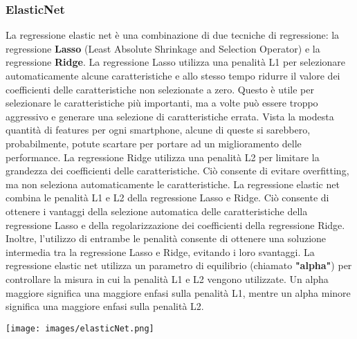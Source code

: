 \documentclass{article}
\begin{document}
        \subsubsection{ElasticNet}\newline
        La regressione elastic net è una combinazione di due tecniche di regressione: la regressione \textbf{Lasso} (Least Absolute Shrinkage and Selection Operator) e la regressione \textbf{Ridge}.\newline
        La regressione Lasso utilizza una penalità L1 per selezionare automaticamente alcune caratteristiche e allo stesso tempo ridurre il valore dei coefficienti delle caratteristiche non selezionate a zero. Questo è utile per selezionare le caratteristiche più importanti, ma a volte può essere troppo aggressivo e generare una selezione di caratteristiche errata. Vista la modesta quantità di features per ogni smartphone, alcune di queste  si sarebbero, probabilmente, potute scartare per portare ad un miglioramento delle performance.\newline
        La regressione Ridge utilizza una penalità L2 per limitare la grandezza dei coefficienti delle caratteristiche. Ciò consente di evitare overfitting, ma non seleziona automaticamente le caratteristiche.\newline
        La regressione elastic net combina le penalità L1 e L2 della regressione Lasso e Ridge. Ciò consente di ottenere i vantaggi della selezione automatica delle caratteristiche della regressione Lasso e della regolarizzazione dei coefficienti della regressione Ridge. Inoltre, l'utilizzo di entrambe le penalità consente di ottenere una soluzione intermedia tra la regressione Lasso e Ridge, evitando i loro svantaggi.\newline
        La regressione elastic net utilizza un parametro di equilibrio (chiamato \textbf{"alpha"}) per controllare la misura in cui la penalità L1 e L2 vengono utilizzate. Un alpha maggiore significa una maggiore enfasi sulla penalità L1, mentre un alpha minore significa una maggiore enfasi sulla penalità L2.\newline
        \begin{center}
            \texttt{[image: images/elasticNet.png]}
        \end{center}
        \newpage
\end{document}
